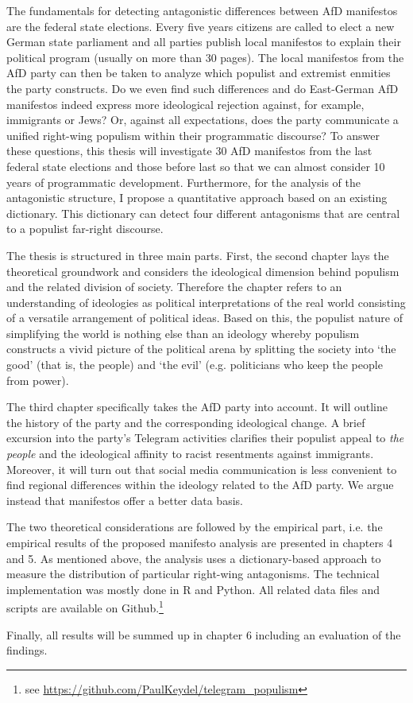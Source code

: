 \documentclass[a4paper]{scrreprt}
\begin{document}
The fundamentals for detecting antagonistic differences between AfD manifestos are the federal state elections. Every five years citizens are called to elect a new German state parliament and all parties publish local manifestos to explain their political program (usually on more than 30 pages). The local manifestos from the AfD party can then be taken to analyze which populist and extremist enmities the party constructs. Do we even find such differences and do East-German AfD manifestos indeed express more ideological rejection against, for example, immigrants or Jews? Or, against all expectations, does the party communicate a unified right-wing populism within their programmatic discourse? To answer these questions, this thesis will investigate 30 AfD manifestos from the last federal state elections and those before last so that we can almost consider 10 years of programmatic development. Furthermore, for the analysis of the antagonistic structure, I propose a quantitative approach based on an existing dictionary. This dictionary can detect four different antagonisms that are central to a populist far-right discourse.\par
The thesis is structured in three main parts. First, the second chapter lays the theoretical groundwork and considers the ideological dimension behind populism and the related division of society. Therefore the chapter refers to an understanding of ideologies as political interpretations of the real world consisting of a versatile arrangement of political ideas. Based on this, the populist nature of simplifying the world is nothing else than an ideology whereby populism constructs a vivid picture of the political arena by splitting the society into `the good' (that is, the people) and `the evil' (e.g. politicians who keep the people from power).\par
The third chapter specifically takes the AfD party into account. It will outline the history of the party and the corresponding ideological change. A brief excursion into the party's Telegram activities clarifies their populist appeal to {\em the people} and the ideological affinity to racist resentments against immigrants. Moreover, it will turn out that social media communication is less convenient to find regional differences within the ideology related to the AfD party. We argue instead that manifestos offer a better data basis.\par
The two theoretical considerations are followed by the empirical part, i.e. the empirical results of the proposed manifesto analysis are presented in chapters 4 and 5. As mentioned above, the analysis uses a dictionary-based approach to measure the distribution of particular right-wing antagonisms. The technical implementation was mostly done in R and Python. All related data files and scripts are available on Github.\footnote{see \url{https://github.com/PaulKeydel/telegram_populism}}\par
Finally, all results will be summed up in chapter 6 including an evaluation of the findings.
\end{document}

